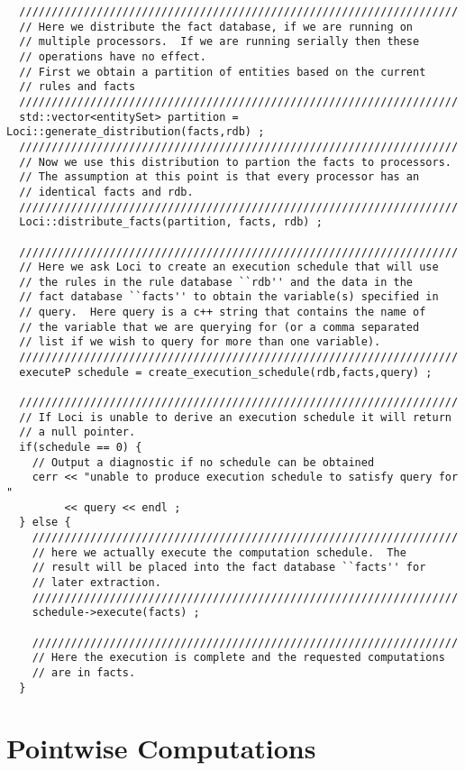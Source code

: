 \documentclass[10pt,epsf]{book}
\begin{document}
\begin{verbatim}
  ////////////////////////////////////////////////////////////////////
  // Here we distribute the fact database, if we are running on
  // multiple processors.  If we are running serially then these
  // operations have no effect.
  // First we obtain a partition of entities based on the current
  // rules and facts
  ////////////////////////////////////////////////////////////////////
  std::vector<entitySet> partition = Loci::generate_distribution(facts,rdb) ;
  ////////////////////////////////////////////////////////////////////
  // Now we use this distribution to partion the facts to processors.
  // The assumption at this point is that every processor has an 
  // identical facts and rdb.
  ////////////////////////////////////////////////////////////////////
  Loci::distribute_facts(partition, facts, rdb) ;

  ////////////////////////////////////////////////////////////////////
  // Here we ask Loci to create an execution schedule that will use
  // the rules in the rule database ``rdb'' and the data in the
  // fact database ``facts'' to obtain the variable(s) specified in
  // query.  Here query is a c++ string that contains the name of
  // the variable that we are querying for (or a comma separated
  // list if we wish to query for more than one variable).
  ////////////////////////////////////////////////////////////////////
  executeP schedule = create_execution_schedule(rdb,facts,query) ;

  ////////////////////////////////////////////////////////////////////
  // If Loci is unable to derive an execution schedule it will return
  // a null pointer.
  if(schedule == 0) {
    // Output a diagnostic if no schedule can be obtained
    cerr << "unable to produce execution schedule to satisfy query for "
         << query << endl ;
  } else {
    //////////////////////////////////////////////////////////////////
    // here we actually execute the computation schedule.  The
    // result will be placed into the fact database ``facts'' for
    // later extraction.
    //////////////////////////////////////////////////////////////////
    schedule->execute(facts) ;

    //////////////////////////////////////////////////////////////////
    // Here the execution is complete and the requested computations
    // are in facts.
  }
\end{verbatim}




\section{Pointwise Computations}
\end{document}
